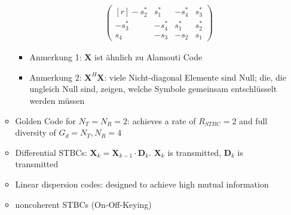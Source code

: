 \documentclass[a4paper, 10pt]{article}
\begin{document}
\begin{itemize}
\begin{itemize}
\begin{itemize}
\begin{align*}
\begin{pmatrix*}[r]
					-s_2^* & s_1^* & -s_4^* & s_3^*\\
					-s_3^* & -s_4^* & s_1^* & s_2^*\\
					s_4 & -s_3 & -s_2 & s_1
				\end{pmatrix*}
			\end{align*}
			\item Anmerkung 1:  $\textbf{X} $ ist \"ahnlich zu Alamouti Code
			\item Anmerkung 2: $\textbf{X}^H\textbf{X}$: viele Nicht-diagonal Elemente sind Null; die, die ungleich Null sind, zeigen, welche Symbole gemeinsam entschl\"usselt werden m\"ussen 		
		\end{itemize}
		\item Golden Code for $ N_T = N_R = 2$: achieves a rate of $R_{STBC} = 2 $ and full diversity of $ G_d = N_T, N_R = 4$
		\item Differential STBCs: $\textbf{X}_k = \textbf{X}_{k-1}\cdot \textbf{D}_k $. $\textbf{X}_k $ is transmitted, $\textbf{D}_k $ is transmitted 
		\item Linear dispersion codes: designed to achieve high mutual information
		\item noncoherent STBCs (On-Off-Keying)
	\end{itemize}
\end{itemize}
\end{document}
